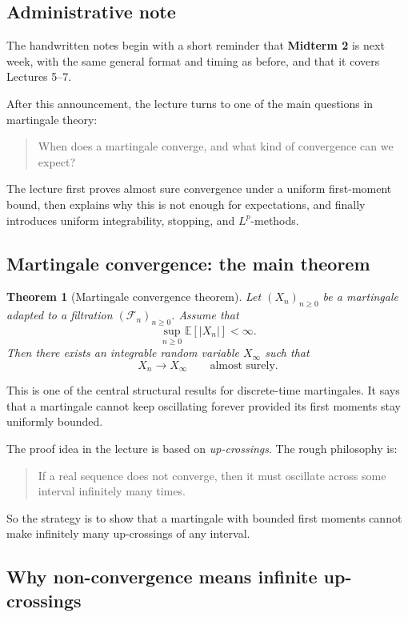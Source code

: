 \documentclass[11pt]{article}
\newtheorem{theorem}{Theorem}[section]
\theoremstyle{definition}
\begin{document}
\subsection{Administrative note}

The handwritten notes begin with a short reminder that \textbf{Midterm 2} is next week, with the same general format and timing as before, and that it covers Lectures 5--7.

After this announcement, the lecture turns to one of the main questions in martingale theory:
\begin{quote}
When does a martingale converge, and what kind of convergence can we expect?
\end{quote}

The lecture first proves almost sure convergence under a uniform first-moment bound, then explains why this is not enough for expectations, and finally introduces uniform integrability, stopping, and \(L^p\)-methods.

\subsection{Martingale convergence: the main theorem}

\begin{theorem}[Martingale convergence theorem]
Let \((X_n)_{n\ge 0}\) be a martingale adapted to a filtration \((\mathcal F_n)_{n\ge 0}\). Assume that
\[
\sup_{n\ge 0} \mathbb E[|X_n|] < \infty.
\]
Then there exists an integrable random variable \(X_\infty\) such that
\[
X_n \to X_\infty
\qquad \text{almost surely.}
\]
\end{theorem}

This is one of the central structural results for discrete-time martingales. It says that a martingale cannot keep oscillating forever provided its first moments stay uniformly bounded.

The proof idea in the lecture is based on \emph{up-crossings}. The rough philosophy is:
\begin{quote}
If a real sequence does not converge, then it must oscillate across some interval infinitely many times.
\end{quote}
So the strategy is to show that a martingale with bounded first moments cannot make infinitely many up-crossings of any interval.

\subsection{Why non-convergence means infinite up-crossings}
\end{document}
